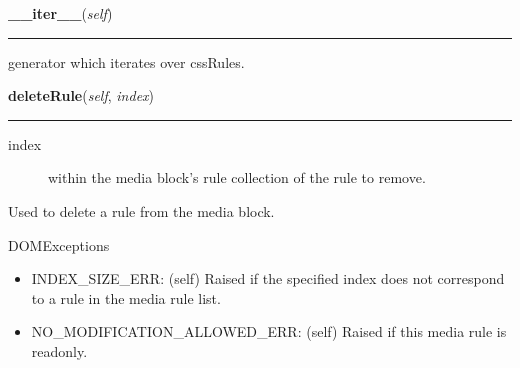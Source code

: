 \hspace{.8\funcindent}\begin{boxedminipage}{\funcwidth}

    \raggedright \textbf{\_\_iter\_\_}(\textit{self})

    \vspace{-1.5ex}

    \rule{\textwidth}{0.5\fboxrule}
\setlength{\parskip}{2ex}

generator which iterates over cssRules.
\setlength{\parskip}{1ex}
    \end{boxedminipage}

    \label{cssutils:css:cssmediarule:CSSMediaRule:deleteRule}

    \vspace{0.5ex}

\hspace{.8\funcindent}\begin{boxedminipage}{\funcwidth}

    \raggedright \textbf{deleteRule}(\textit{self}, \textit{index})

    \vspace{-1.5ex}

    \rule{\textwidth}{0.5\fboxrule}
\setlength{\parskip}{2ex}
\begin{description}
\item[{index}] \leavevmode 
within the media block's rule collection of the rule to remove.

\end{description}

Used to delete a rule from the media block.

DOMExceptions
\begin{itemize}
\item {} 
INDEX{\_}SIZE{\_}ERR: (self)
Raised if the specified index does not correspond to a rule in
the media rule list.

\item {} 
NO{\_}MODIFICATION{\_}ALLOWED{\_}ERR: (self)
Raised if this media rule is readonly.

\end{itemize}
\setlength{\parskip}{1ex}
    \end{boxedminipage}

    \label{cssutils:css:cssmediarule:CSSMediaRule:add}


